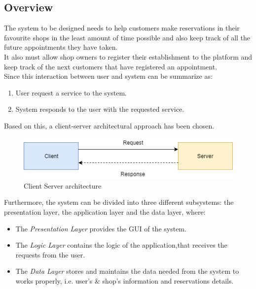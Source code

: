 \subsection{Overview}
The system to be designed needs to help customers make reservations in their favourite shops in the least amount of time possible and also keep track of all the future appointments they have taken.\\
It also must allow shop owners to register their establishment to the platform and keep track of the next customers that have registered an appointment.\\
Since this interaction between user and system can be summarize as:
\begin{enumerate}
	\item User request a service to the system.
	\item System responds to the user with the requested service.
\end{enumerate}
Based on this, a client-server architectural approach has been chosen.
\begin{figure}[H]
	\includegraphics{Img/ClientServerArchitecture}
	\caption{Client Server architecture}
	\label{fig:clientserver}
\end{figure}
\noindent Furthermore, the system can be divided into three different subsystems: the presentation layer, the application layer and the data layer, where: 
\begin{itemize}
	\item The \emph{Presentation Layer} provides the GUI of the system.
	\item The \emph{Logic Layer} contains the logic of the application,that receives the requests from the user.
	\item The \emph{Data Layer} stores and maintains the data needed from the system to works properly, i.e. user's \& shop's information and reservations details.
\end{itemize}
